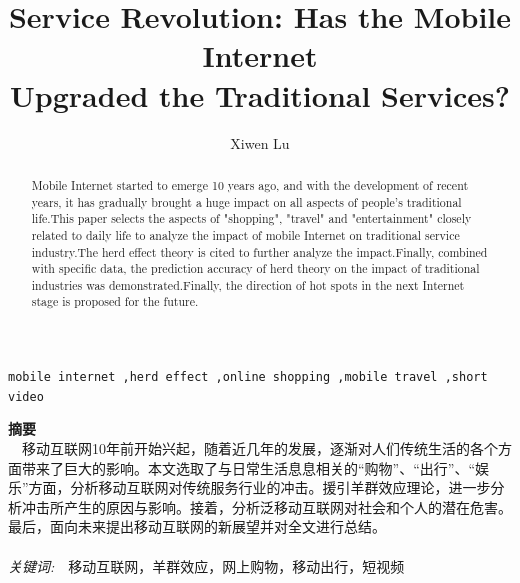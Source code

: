 \documentclass{elsarticle}
\begin{document}
	
\begin{frontmatter}

\title{\textbf{Service Revolution: Has the Mobile Internet\\Upgraded the Traditional Services?}}


\author{Xiwen Lu}%
\address{School of Computer Science and Technology, China University of Mining and Technology}



\begin{abstract}
Mobile Internet started to emerge 10 years ago, and with the development of recent years, it has gradually brought a huge impact on all aspects of people's traditional life.This paper selects the aspects of "shopping", "travel" and "entertainment" closely related to daily life to analyze the impact of mobile Internet on traditional service industry.The herd effect theory is cited to further analyze the impact.Finally, combined with specific data, the prediction accuracy of herd theory on the impact of traditional industries was demonstrated.Finally, the direction of hot spots in the next Internet stage is proposed for the future. 
\end{abstract}


\begin{keyword}
\texttt{mobile internet \sep herd effect \sep online shopping \sep mobile travel \sep short video}
\end{keyword}
\end{frontmatter}

\begin{CJK}{UTF8}{song}

\noindent\textbf{摘要}\\
\indent \ \ 移动互联网10年前开始兴起，随着近几年的发展，逐渐对人们传统生活的各个方面带来了巨大的影响。本文选取了与日常生活息息相关的“购物”、“出行”、“娱乐”方面，分析移动互联网对传统服务行业的冲击。援引羊群效应理论，进一步分析冲击所产生的原因与影响。接着，分析泛移动互联网对社会和个人的潜在危害。最后，面向未来提出移动互联网的新展望并对全文进行总结。\\
\\
\textsl{关键词:}\ \ 移动互联网，羊群效应，网上购物，移动出行，短视频

\end{CJK}
\end{document}
